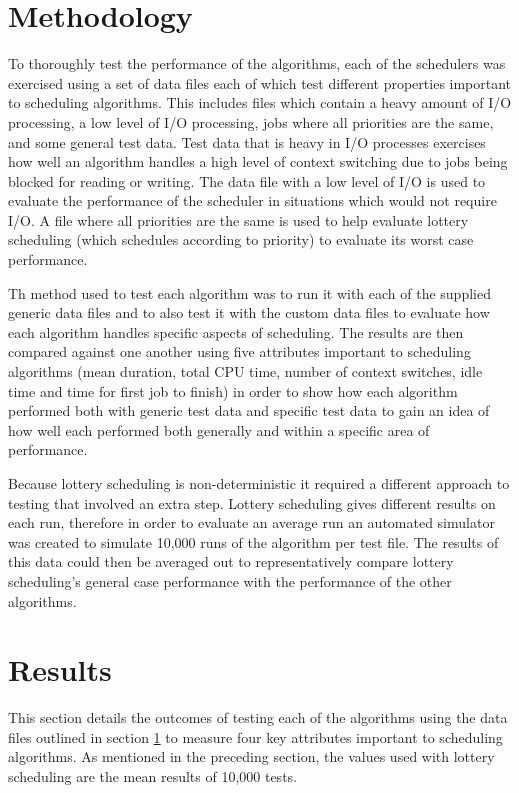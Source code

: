 \documentclass{acm_proc_article-sp}
\begin{document}
\section{Methodology} 
\label{methodology}
To thoroughly test the performance of the algorithms, each of the schedulers was exercised using a set of data files each of which test different properties important to scheduling algorithms. This includes files which contain a heavy amount of I/O processing, a low level of I/O processing, jobs where all priorities are the same, and some general test data. Test data that is heavy in I/O processes exercises how well an algorithm handles a high level of context switching due to jobs being blocked for reading or writing. The data file with a low level of I/O is used to evaluate the performance of the scheduler in situations which would not require I/O. A file where all priorities are the same is used to help evaluate lottery scheduling (which schedules according to priority) to evaluate its worst case performance.

Th method used to test each algorithm was to run it with each of the supplied generic data files and to also test it with the custom data files to evaluate how each algorithm handles specific aspects of scheduling. The results are then compared against one another using five attributes important to scheduling algorithms (mean duration, total CPU time, number of context switches, idle time and time for first job to finish) in order to show how each algorithm performed both with generic test data and specific test data to gain an idea of how well each performed both generally and within a specific area of performance.

Because lottery scheduling is non-deterministic it required a different approach to testing that involved an extra step. Lottery scheduling gives different results on each run, therefore in order to evaluate an average run an automated simulator was created to simulate 10,000 runs of the algorithm per test file. The results of this data could then be averaged out to representatively compare lottery scheduling's general case performance with the performance of the other algorithms.

\section{Results}
\label{results}
This section details the outcomes of testing each of the algorithms using the data files outlined in section \ref{methodology} to measure four key attributes important to scheduling algorithms. As mentioned in the preceding section, the values used with lottery scheduling are the mean results of 10,000 tests.
\end{document}
